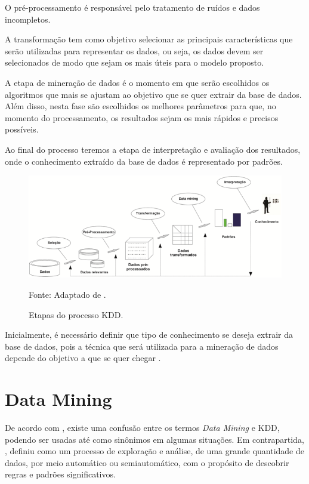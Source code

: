 \documentclass[
	12pt,				%
	openright,			%
	oneside,	
	a4paper,				%
	english,				%
	brazil				%
]{abntex2/abntex2} %
\begin{document}
	O pré-processamento é responsável pelo tratamento de ruídos e dados incompletos.
	
	A transformação tem como objetivo selecionar as principais características que serão utilizadas para representar os dados, ou seja, os dados devem ser selecionados de  modo que sejam os mais úteis para o modelo proposto.
	
	A etapa de mineração de dados é o momento em que serão escolhidos os  algoritmos que mais se ajustam ao objetivo que se quer extrair da base de dados. Além disso, nesta fase são escolhidos os melhores parâmetros para que, no momento do processamento, os resultados sejam os mais rápidos e precisos possíveis.
	
	Ao final do processo teremos a etapa de interpretação e avaliação dos resultados, onde o conhecimento extraído da base de dados é representado por padrões.
\\
		\begin{figure}[h!]
			\caption{\label{figDataMiningFayyad} Etapas do processo KDD.}
			\begin{center}
			    \includegraphics[scale=1]{img/dataMiningFayyad.png}
			\end{center}
			Fonte: Adaptado de \cite{fayyad:1996}.
		\end{figure}
		
		Inicialmente, é necessário definir que tipo de conhecimento se deseja extrair da base de dados, pois a técnica que será utilizada para a mineração de dados depende do objetivo a que se quer chegar \cite{damasceno:2005}.
		
	\section{Data Mining}
	
		De acordo com \cite{adriaans:1996}, existe uma confusão entre os termos \textit{Data Mining} e KDD, podendo ser usadas até como sinônimos em algumas situações. Em contrapartida, \cite{berry:1997}, definiu como um processo de exploração e análise, de uma grande quantidade de dados, por meio automático ou semiautomático, com o propósito de descobrir regras e padrões significativos.
		
\end{document}
